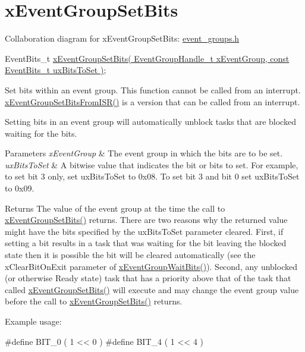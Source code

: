 \hypertarget{group__x_event_group_set_bits}{}\section{x\+Event\+Group\+Set\+Bits}
\label{group__x_event_group_set_bits}
Collaboration diagram for x\+Event\+Group\+Set\+Bits\+:
\hyperlink{event__groups_8h}{event\+\_\+groups.\+h} 
\begin{DoxyPre}
   EventBits\_t \hyperlink{event__groups_8h_a02d7b3bb55f7e11d9c47116266c5fb2e}{xEventGroupSetBits( EventGroupHandle\_t xEventGroup, const EventBits\_t uxBitsToSet )};
\end{DoxyPre}


Set bits within an event group. This function cannot be called from an interrupt. \hyperlink{event__groups_8h_a62b68278abac6358369ae8e390988a02}{x\+Event\+Group\+Set\+Bits\+From\+I\+S\+R()} is a version that can be called from an interrupt.

Setting bits in an event group will automatically unblock tasks that are blocked waiting for the bits.


\begin{DoxyParams}{Parameters}
{\em x\+Event\+Group} & The event group in which the bits are to be set.\\
\hline
{\em ux\+Bits\+To\+Set} & A bitwise value that indicates the bit or bits to set. For example, to set bit 3 only, set ux\+Bits\+To\+Set to 0x08. To set bit 3 and bit 0 set ux\+Bits\+To\+Set to 0x09.\\
\hline
\end{DoxyParams}
\begin{DoxyReturn}{Returns}
The value of the event group at the time the call to \hyperlink{event__groups_8h_a02d7b3bb55f7e11d9c47116266c5fb2e}{x\+Event\+Group\+Set\+Bits()} returns. There are two reasons why the returned value might have the bits specified by the ux\+Bits\+To\+Set parameter cleared. First, if setting a bit results in a task that was waiting for the bit leaving the blocked state then it is possible the bit will be cleared automatically (see the x\+Clear\+Bit\+On\+Exit parameter of \hyperlink{event__groups_8h_aab9d5b405bc57b7624dcabe9a9a503db}{x\+Event\+Group\+Wait\+Bits()}). Second, any unblocked (or otherwise Ready state) task that has a priority above that of the task that called \hyperlink{event__groups_8h_a02d7b3bb55f7e11d9c47116266c5fb2e}{x\+Event\+Group\+Set\+Bits()} will execute and may change the event group value before the call to \hyperlink{event__groups_8h_a02d7b3bb55f7e11d9c47116266c5fb2e}{x\+Event\+Group\+Set\+Bits()} returns.
\end{DoxyReturn}
Example usage\+: 
\begin{DoxyPre}
  #define BIT\_0 ( 1 << 0 )
  #define BIT\_4 ( 1 << 4 )\end{DoxyPre}



